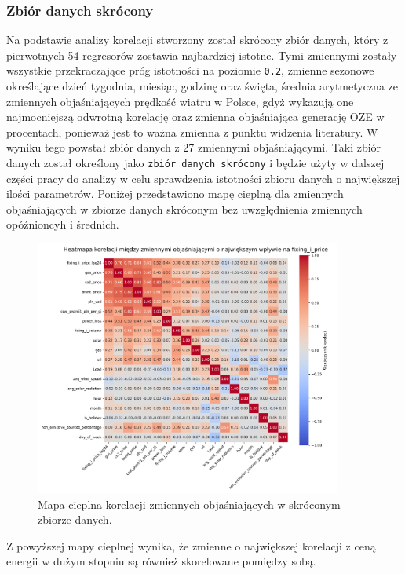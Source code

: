 \subsubsection{Zbiór danych skrócony}
Na podstawie analizy korelacji stworzony został skrócony zbiór danych, który z pierwotnych 54 regresorów zostawia najbardziej istotne. Tymi zmiennymi zostały wszystkie przekraczające próg istotności na poziomie \texttt{0.2},  zmienne sezonowe określające dzień tygodnia, miesiąc, godzinę oraz święta, średnia arytmetyczna ze zmiennych objaśniających prędkość wiatru w Polsce, gdyż wykazują one najmocniejszą odwrotną korelację oraz zmienna objaśniająca generację OZE w procentach, ponieważ jest to ważna zmienna z punktu widzenia literatury. W wyniku tego powstał zbiór danych z 27 zmiennymi objaśniającymi. Taki zbiór danych został określony jako \texttt{zbiór danych skrócony} i będzie użyty w dalszej części pracy do analizy w celu sprawdzenia istotności zbioru danych o największej ilości parametrów. Poniżej przedstawiono mapę cieplną dla zmiennych objaśniających w zbiorze danych skróconym bez uwzględnienia zmiennych opóźnioncyh i średnich. 

\begin{figure}[H]
    \centering
    \includegraphics[width=0.9\textwidth]{../plots/heatmap_short_db_features.png}
    \caption{Mapa cieplna korelacji zmiennych objaśniających w skróconym zbiorze danych.}
    \label{fig:heatmap_shortened_dataset}
\end{figure}

Z powyższej mapy cieplnej wynika, że zmienne o największej korelacji z ceną energii w dużym stopniu są również skorelowane pomiędzy sobą. 

